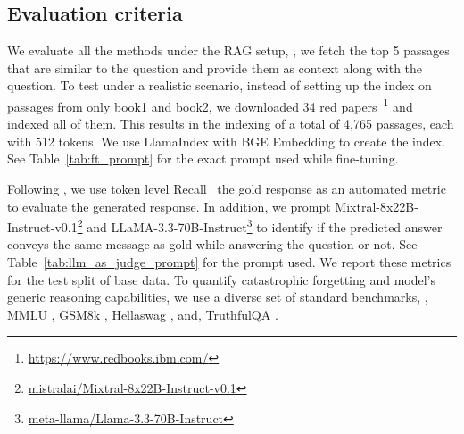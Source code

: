 \subsection{Evaluation criteria}

We evaluate all the methods under the RAG setup, \ie, we fetch the top 5 passages that are similar to the question and provide them as context along with the question. 
To test under a realistic scenario, instead of setting up the index on passages from only book1 and book2, we  downloaded 34 red papers~\footnote{\url{https://www.redbooks.ibm.com/}} and indexed all of them. This results in the indexing of a total of 4,765 passages,
each with 512 tokens. We use LlamaIndex with BGE Embedding \cite{xiao2023c} to create the index. 
See Table~\ref{tab:ft_prompt} for the exact prompt used while fine-tuning. 

Following \cite{adlakha2023evaluating}, we use token level Recall \wrt\ the gold response as an automated metric to evaluate the generated response. 
In addition, we prompt Mixtral-8x22B-Instruct-v0.1\footnote{\href{https://huggingface.co/mistralai/Mixtral-8x22B-Instruct-v0.1}{mistralai/Mixtral-8x22B-Instruct-v0.1}} and LLaMA-3.3-70B-Instruct\footnote{\href{https://huggingface.co/meta-llama/Llama-3.3-70B-Instruct}{meta-llama/Llama-3.3-70B-Instruct}} to identify if the predicted answer conveys the same message as gold while answering the question or not. See Table~\ref{tab:llm_as_judge_prompt} for the prompt used. We report these metrics for the test split of base data.
To quantify catastrophic forgetting and model's generic reasoning capabilities, we use a diverse set of standard benchmarks, \viz, MMLU \cite{hendrycks2020measuring}, GSM8k \cite{cobbe2021gsm8k}, Hellaswag \cite{zellers2019hellaswag}, and, TruthfulQA \cite{lin2022truthfulqa}.



